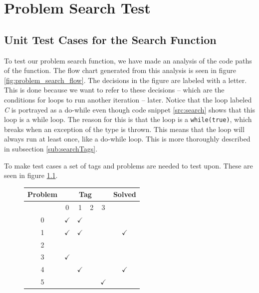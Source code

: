 \chapter{Problem Search Test}
\label{chap:problem_search_test}

\section{Unit Test Cases for the Search Function}
To test our problem search function, we have made an analysis of the code paths of the function.
The flow chart generated from this analysis is seen in figure \ref{fig:problem_search_flow}.
The decisions in the figure are labeled with a letter.
This is done because we want to refer to these decisions -- which are the conditions for loops to run another iteration -- later.
Notice that the loop labeled \textit{C} is portrayed as a do-while even though code snippet \ref{src:search} shows that this loop is a while loop.
The reason for this is that the loop is a \verb|while(true)|, which breaks when an exception of the type  is thrown.
This means that the loop will always run at least once, like a do-while loop.
This is more thoroughly described in subsection \ref{sub:searchTags}.

To make test cases a set of tags and problems are needed to test upon.
These are seen in figure \ref{tab:problem_search_base}.

\begin{figure}[hp]
	\centering
		\begin{tabular}{|c|c|c|c|c|c|}
		\hline
			Problem	& \multicolumn{4}{c|}{Tag} & Solved \\ \hline
								& 0&1&2&3& \\ \hline
			0					& $\checkmark$ & $\checkmark$ & & & \\ \hline
			1					& $\checkmark$ & $\checkmark$ & & & $\checkmark$  \\ \hline
			2					& & & & & \\ \hline
			3					& $\checkmark$& & & & \\ \hline
			4					& & $\checkmark$& & & $\checkmark$ \\ \hline
			5					& & & & $\checkmark$ & \\ \hline
		\end{tabular}
	\label{tab:problem_search_base}
\end{figure}

